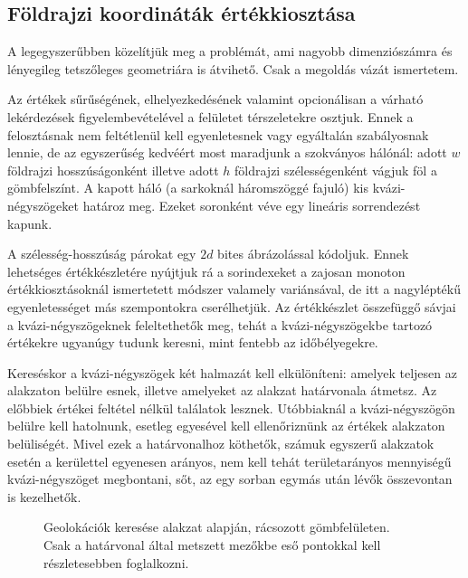\documentclass[
    parspace,
    noindent,
    nohyp,
]{elteiktdk}[2023/04/10]
\begin{document}
\subsection{Földrajzi koordináták értékkiosztása}

A legegyszerűbben közelítjük meg a problémát,
ami nagyobb dimenziószámra és lényegileg tetszőleges geometriára is átvihető.
Csak a megoldás vázát ismertetem.

Az értékek sűrűségének, elhelyezkedésének valamint opcionálisan a várható lekérdezések
figyelembevételével a felületet térszeletekre osztjuk.
Ennek a felosztásnak nem feltétlenül kell egyenletesnek vagy egyáltalán szabályosnak lennie,
de az egyszerűség kedvéért most maradjunk a szokványos hálónál:
adott $w$ földrajzi hosszúságonként illetve adott $h$ földrajzi szélességenként vágjuk föl a gömbfelszínt.
A kapott háló (a sarkoknál háromszöggé fajuló) kis kvázi-négyszögeket határoz meg.
Ezeket soronként véve egy lineáris sorrendezést kapunk.

A szélesség-hosszúság párokat egy $2d$ bites ábrázolással kódoljuk.
Ennek lehetséges értékkészletére nyújtjuk rá a sorindexeket
a zajosan monoton értékkiosztásoknál ismertetett módszer valamely variánsával,
de itt a nagyléptékű egyenletességet más szempontokra cserélhetjük.
Az értékkészlet összefüggő sávjai a kvázi-négyszögeknek feleltethetők meg,
tehát a kvázi-négyszögekbe tartozó értékekre ugyanúgy tudunk keresni,
mint fentebb az időbélyegekre.

Kereséskor a kvázi-négyszögek két halmazát kell elkülöníteni:
amelyek teljesen az alakzaton belülre esnek,
illetve amelyeket az alakzat határvonala átmetsz.
Az előbbiek értékei feltétel nélkül találatok lesznek.
Utóbbiaknál a kvázi-négyszögön belülre kell hatolnunk,
esetleg egyesével kell ellenőriznünk az értékek alakzaton belüliségét.
Mivel ezek a határvonalhoz köthetők,
számuk egyszerű alakzatok esetén a kerülettel egyenesen arányos,
nem kell tehát területarányos mennyiségű kvázi-négyszöget megbontani,
sőt, az egy sorban egymás után lévők összevontan is kezelhetők.

\begin{figure}[H]
\centering

\caption[Geolokációk keresése alakzat alapján]{
    Geolokációk keresése alakzat alapján, rácsozott gömbfelületen. \\
    Csak a határvonal által metszett mezőkbe eső pontokkal kell részletesebben foglalkozni.
}
\end{figure}
\end{document}

